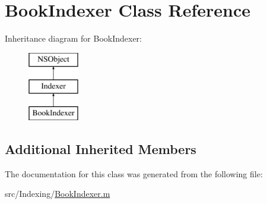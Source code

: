 \hypertarget{interface_book_indexer}{\section{Book\-Indexer Class Reference}
\label{interface_book_indexer}
}
Inheritance diagram for Book\-Indexer\-:\begin{figure}[H]
\begin{center}
\leavevmode
\includegraphics[height=3.000000cm]{interface_book_indexer}
\end{center}
\end{figure}
\subsection*{Additional Inherited Members}


The documentation for this class was generated from the following file\-:\begin{DoxyCompactItemize}
\item 
src/\-Indexing/\hyperlink{_book_indexer_8m}{Book\-Indexer.\-m}\end{DoxyCompactItemize}
